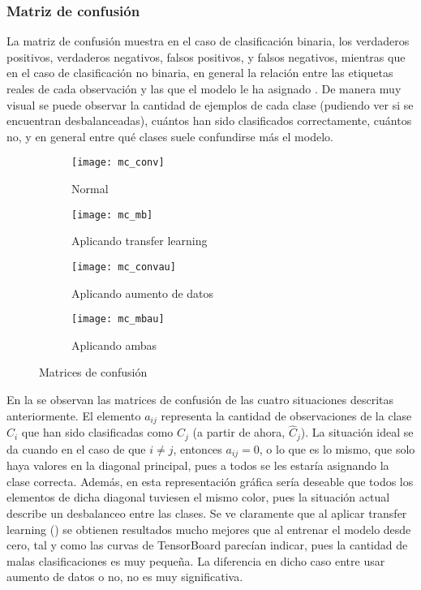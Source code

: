 			\subsubsection{Matriz de confusión}\label{subsub:matriz_confusion}
			
				La matriz de confusión muestra en el caso de clasificación binaria, los verdaderos positivos, verdaderos negativos, falsos positivos, y falsos negativos, mientras que en el caso de clasificación no binaria, en general la relación entre las etiquetas reales de cada observación y las que el modelo le ha asignado \cite{confusion}. De manera muy visual se puede observar la cantidad de ejemplos de cada clase (pudiendo ver si se encuentran desbalanceadas), cuántos han sido clasificados correctamente, cuántos no, y en general entre qué clases suele confundirse más el modelo. \\
				
				\begin{figure}[!h]
					\centering
					\begin{subfigure}{.4\textwidth}
						\centering
						\texttt{[image: mc\_conv]}
						\caption{Normal}
						\label{fig:mc_conv}
					\end{subfigure}\hfill
					\begin{subfigure}{.4\textwidth}
						\centering
						\texttt{[image: mc\_mb]}
						\caption{Aplicando transfer learning}
						\label{fig:mc_mb}
					\end{subfigure}
					\begin{subfigure}{.4\textwidth}
						\centering
						\texttt{[image: mc\_convau]}
						\caption{Aplicando aumento de datos}
						\label{fig:mc_convau}
					\end{subfigure}\hfill
					\begin{subfigure}{.4\textwidth}
						\centering
						\texttt{[image: mc\_mbau]}
						\caption{Aplicando ambas}
						\label{fig:mc_mbau}
					\end{subfigure}
					\caption{Matrices de confusión}
					\label{fig:mc}
				\end{figure}
				
				En la  se observan las matrices de confusión de las cuatro situaciones descritas anteriormente. El elemento $a_{ij}$ representa la cantidad de observaciones de la clase $C_i$ que han sido clasificadas como $C_j$ (a partir de ahora, $\hat{C}_j$). La situación ideal se da cuando en el caso de que $i \neq j$, entonces $a_{ij} = 0$, o lo que es lo mismo, que solo haya valores  en la diagonal principal, pues a todos se les estaría asignando la clase correcta. Además, en esta representación gráfica sería deseable que todos los elementos de dicha diagonal tuviesen el mismo color, pues la situación actual describe un desbalanceo entre las clases. Se ve claramente que al aplicar transfer learning () se obtienen resultados mucho mejores que al entrenar el modelo desde cero, tal y como las curvas de TensorBoard parecían indicar, pues la cantidad de malas clasificaciones es muy pequeña. La diferencia en dicho caso entre usar aumento de datos o no, no es muy significativa. \\
				
